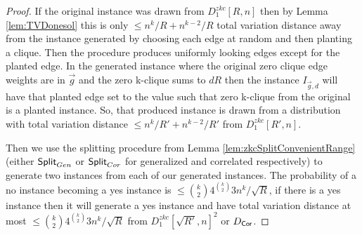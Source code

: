 \begin{proof}
	If the original instance was drawn from $D^{zkc}_{1}[R,n]$ then by Lemma \ref{lem:TVDonesol} this is only $\leq n^k/R + n^{k-2}/R$ total variation distance away from the instance generated by choosing each edge at random and then planting a clique. Then the procedure produces uniformly looking edges except for the planted edge. In the generated instance where the original zero clique edge weights are in $\vec{g}$ and the zero k-clique sums to $dR$ then the instance $I_{\vec{g},d}$ will have that planted edge set to the value such that zero k-clique from the original is a planted instance. So, that produced instance is drawn from a distribution with total variation distance $\leq n^k/R' + n^{k-2}/{R'}$ from $D^{zkc}_{1}[R',n]$. 
	
	Then we use the splitting procedure from Lemma \ref{lem:zkcSplitConvenientRange} (either $\mathsf{Split}_{Gen}$ or $\mathsf{Split}_{Cor}$ for generalized and correlated respectively) to generate two instances from each of our generated instances. The probability of a no instance becoming a yes instance is $\leq \binom{k}{2}4^{\binom{k}{2}}3 n^k/\sqrt{R}$, if there is a yes instance then it will generate a yes instance and have total variation distance at most $\leq \binom{k}{2}4^{\binom{k}{2}}3 n^k/\sqrt{R}$ from $D^{zkc}_{1}[\sqrt{R'},n]^2$ or $D_{\mathsf{Cor}}$.
\end{proof}
